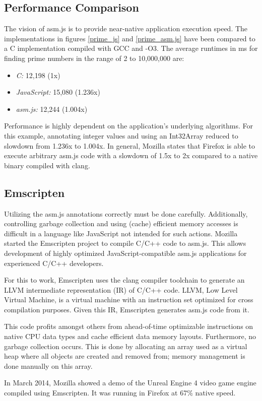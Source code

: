 \subsection{Performance Comparison}

The vision of asm.js is to provide near-native application execution speed. The implementations in figures \ref{prime_js} and \ref{prime_asm.js} have been compared to a C implementation compiled with GCC and -O3. The average runtimes in ms for finding prime numbers in the range of 2 to 10,000,000 are:

\begin{itemize}
\item \textit{C:} 12,198 (1x)
\item \textit{JavaScript:} 15,080 (1.236x)
\item \textit{asm.js:} 12,244 (1.004x)
\end{itemize}

Performance is highly dependent on the application's underlying algorithms. For this example, annotating integer values and using an Int32Array reduced to slowdown from 1.236x to 1.004x. In general, Mozilla states that Firefox is able to execute arbitrary asm.js code with a slowdown of 1.5x to 2x compared to a native binary compiled with clang. \cite{asm.js_spec}


\subsection{Emscripten}

Utilizing the asm.js annotations correctly must be done carefully. Additionally, controlling garbage collection and using (cache) efficient memory accesses is difficult in a language like JavaScript not intended for such actions. Mozilla started the Emscripten project to compile C/C++ code to asm.js. This allows development of highly optimized JavaScript-compatible asm.js applications for experienced C/C++ developers.

For this to work, Emscripten uses the clang compiler toolchain to generate an LLVM intermediate representation (IR) of C/C++ code. LLVM, Low Level Virtual Machine, is a virtual machine with an instruction set optimized for cross compilation purposes. Given this IR, Emscripten generates asm.js code from it.

This code profits amongst others from ahead-of-time optimizable instructions on native CPU data types and cache efficient data memory layouts. Furthermore, no garbage collection occurs. This is done by allocating an array used as a virtual heap where all objects are created and removed from; memory management is done manually on this array. \cite{asm.js_spec}

In March 2014, Mozilla showed a demo of the Unreal Engine 4 video game engine compiled using Emscripten. It was running in Firefox at 67\% native speed. \cite{ue4ff}

